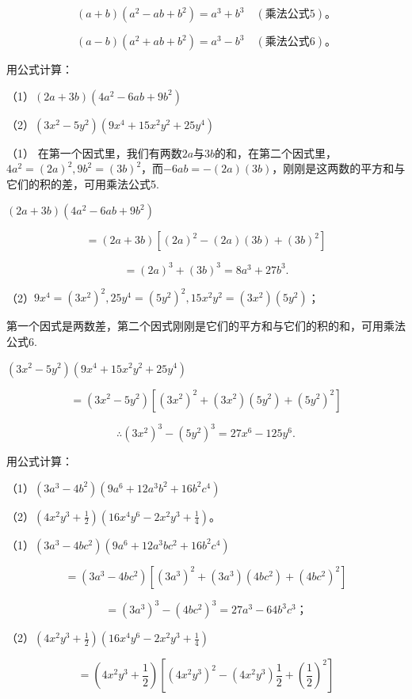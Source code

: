 \[
(a + b) (a ^{2} - a b + b ^{2}) = a ^{3} + b ^{3} \quad (\text{乘法公式} 5)\text{。}
\]

\[
(a - b) (a ^{2} + a b + b ^{2}) = a ^{3} - b ^{3} \quad (\text{乘法公式} 6)\text{。}
\]

 用公式计算：

（1）\((2a + 3b)(4a^{2} - 6ab + 9b^{2})\)

（2）\((3x^{2} - 5y^{2})(9x^{4} + 15x^{2}y^{2} + 25y^{4})\)

 （1）
在第一个因式里，我们有两数\(2a\)与\(3b\)的和，在第二个因式里，\(4a^2 = (2a)^2, 9b^2 = (3b)^2\)，而\(-6ab = -(2a)(3b)\)，刚刚是这两数的平方和与它们的积的差，可用乘法公式5.

\((2a + 3b)(4a^{2} - 6ab + 9b^{2})\)

\[
= (2 a + 3 b) [ (2 a) ^{2} - (2 a) (3 b) + (3 b) ^{2} ]
\]

\[
= (2 a) ^{3} + (3 b) ^{3} = 8 a ^{3} + 27 b ^{3}.
\]

（2）\(9x^{4} = (3x^{2})^{2}, 25y^{4} = (5y^{2})^{2}, 15x^{2}y^{2} = (3x^{2})(5y^{2})\)；

第一个因式是两数差，第二个因式刚刚是它们的平方和与它们的积的和，可用乘法公式6.

\((3x^{2} - 5y^{2})(9x^{4} + 15x^{2}y^{2} + 25y^{4})\)

\[
= (3 x ^{2} - 5 y ^{2}) [ (3 x ^{2}) ^{2} + (3 x ^{2}) (5 y ^{2}) + (5 y ^{2}) ^{2} ]
\]

\[
\therefore (3 x ^{2}) ^{3} - (5 y ^{2}) ^{3} = 27 x ^{6} - 125 y ^{6}.
\]

 用公式计算：

（1）\((3a^{3} - 4b^{2})(9a^{6} + 12a^{3}b^{2} + 16b^{2}c^{4})\)

（2）\(\left(4x^{2}y^{3} + \frac{1}{2}\right)\left(16x^{4}y^{6} - 2x^{2}y^{3} + \frac{1}{4}\right)\)。

（1）\((3a^{3} - 4bc^{2})(9a^{6} + 12a^{3}bc^{2} + 16b^{2}c^{4})\)

\[
= (3 a ^{3} - 4 b c ^{2}) \left[ (3 a ^{3}) ^{2} + (3 a ^{3}) (4 b c ^{2}) + (4 b c ^{2}) ^{2} \right]
\]

\[
= (3 a ^{3}) ^{3} - (4 b c ^{2}) ^{3} = 27 a ^{3} - 64 b ^{3} c ^{3}\text{；}
\]

（2）\(\left(4x^{2}y^{3} + \frac{1}{2}\right)\left(16x^{4}y^{6} - 2x^{2}y^{3} + \frac{1}{4}\right)\)

\[
= \left(4 x ^{2} y ^{3} + \frac{1}{2}\right) \left[ (4 x ^{2} y ^{3}) ^{2} - (4 x ^{2} y ^{3}) \frac{1}{2} + \left(\frac{1}{2}\right) ^{2} \right]
\]


